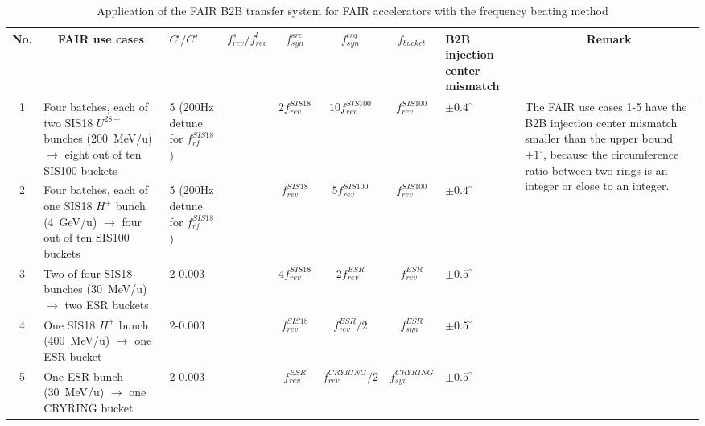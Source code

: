 
\begin{table}
\newcommand{\tabincell}[2]{\begin{tabular}{@{}#1@{}}#2\end{tabular}}
\caption{Application of the FAIR B2B transfer system for FAIR accelerators with the frequency beating method}
\label{use_application}
\begin{center}

    \begin{tabular}{| c | p{3cm} | p{1.5cm} | c | c | c | c | p{1.3cm} |p{4cm} |}
    \hline
     	No. & \multicolumn{1}{|c|}{FAIR use cases} & $C^l/C^s$  & $f^s_\mathit{rev}/f^l_\mathit{rev}$  & $f_\mathit{syn}^\mathit{src}$ & $f_\mathit{syn}^\mathit{trg}$ & $f_\mathit{bucket}$ &B2B injection center mismatch& \multicolumn{1}{|c|}{Remark} \\ \hline
1&	Four batches, each of two SIS18 $U^{28+}$ bunches (\SI{200}{MeV/u}) $\rightarrow$ eight out of ten SIS100 buckets	&	5 (200Hz detune for $f_\mathit{rf}^\mathit{SIS18}$)  & &$2f_\mathit{rev}^\mathit{SIS18}$ & $10f_\mathit{rev}^\mathit{SIS100}$ &$f_\mathit{rev}^\mathit{SIS100}$ &$\pm0.4^\circ$ 	& \multirow{5}{*}{\parbox{4cm}{The FAIR use cases 1-5 have the B2B injection center mismatch smaller than the upper bound $\pm1^\circ$, because the circumference ratio between two rings is an integer or close to an integer.}}\\ \cline{1-8}
2&Four batches, each of one SIS18 $H^{+}$ bunch (\SI{4}{GeV/u}) $\rightarrow$ four out of ten SIS100 buckets	&	5 (200Hz detune for $f_\mathit{rf}^\mathit{SIS18}$)  & &$f_\mathit{rev}^\mathit{SIS18}$ &$5f_\mathit{rev}^\mathit{SIS100}$ &$f_\mathit{rev}^\mathit{SIS100}$ &	$\pm0.4^\circ$	& \\ \cline{1-8}
3&Two of four SIS18 bunches (\SI{30}{MeV/u}) $\rightarrow$ two ESR buckets			&	 2-0.003& &$4f_\mathit{rev}^\mathit{SIS18}$ &$2f_\mathit{rev}^\mathit{ESR}$ &$f_\mathit{rev}^\mathit{ESR}$ &	$\pm0.5^\circ$	&\\ \cline{1-8}
4&One SIS18 $H^{+}$ bunch (\SI{400}{MeV/u}) $\rightarrow$ one ESR bucket	&	 2-0.003& &$f_\mathit{rev}^\mathit{SIS18}$ &$f_\mathit{rev}^\mathit{ESR}/2$ &$f_\mathit{syn}^\mathit{ESR}$ & $\pm0.5^\circ$	& \\ \cline{1-8}
5&One ESR bunch (\SI{30}{MeV/u}) $\rightarrow$ one CRYRING bucket				&	 2-0.003& &$f_\mathit{rev}^\mathit{ESR}$ &$f_\mathit{rev}^\mathit{CRYRING}/2$ &$f_\mathit{syn}^\mathit{CRYRING}$ &$\pm0.5^\circ$	&	\\ \hline

\end{tabular}
\end{center}
\end{table}
